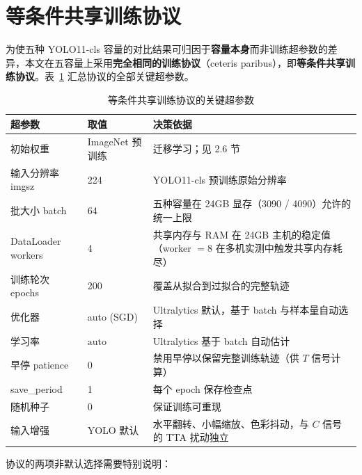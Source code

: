 \documentclass[UTF8,openany,12pt]{ctexbook}
\begin{document}
\section{等条件共享训练协议}
\label{sec:shared-protocol}

为使五种 YOLO11-cls 容量的对比结果可归因于\textbf{容量本身}而非训练超参数的差异，本文在五容量上采用\textbf{完全相同的训练协议}（ceteris paribus），即\textbf{等条件共享训练协议}。表~\ref{tab:shared-protocol} 汇总协议的全部关键超参数。

\begin{table}[H]
    \centering
    \caption{等条件共享训练协议的关键超参数}
    \label{tab:shared-protocol}
    \begin{tabularx}{\textwidth}{p{3.6cm}p{3.2cm}X}
        \toprule
        超参数 & 取值 & 决策依据 \\
        \midrule
        初始权重 & ImageNet 预训练 & 迁移学习\cite{yosinski2014transferable}；见 2.6 节 \\
        输入分辨率 imgsz & 224                & YOLO11-cls 预训练原始分辨率\cite{jocher2023ultralytics} \\
        批大小 batch & 64                     & 五种容量在 24GB 显存（3090 / 4090）允许的统一上限 \\
        DataLoader workers & 4                & 共享内存与 RAM 在 24GB 主机的稳定值（worker $= 8$ 在多机实测中触发共享内存耗尽） \\
        训练轮次 epochs & 200                 & 覆盖从拟合到过拟合的完整轨迹 \\
        优化器 & auto (SGD)                   & Ultralytics 默认，基于 batch 与样本量自动选择 \\
        学习率 & $\mathrm{auto}$              & Ultralytics 基于 batch 自动估计 \\
        早停 patience & 0                     & 禁用早停以保留完整训练轨迹（供 $T$ 信号计算） \\
        save\_period   & 1                    & 每个 epoch 保存检查点 \\
        随机种子 & 0                          & 保证训练可重现 \\
        输入增强 & YOLO 默认                  & 水平翻转、小幅缩放、色彩抖动，与 $C$ 信号的 TTA 扰动独立 \\
        \bottomrule
    \end{tabularx}
\end{table}

协议的两项非默认选择需要特别说明：
\end{document}
